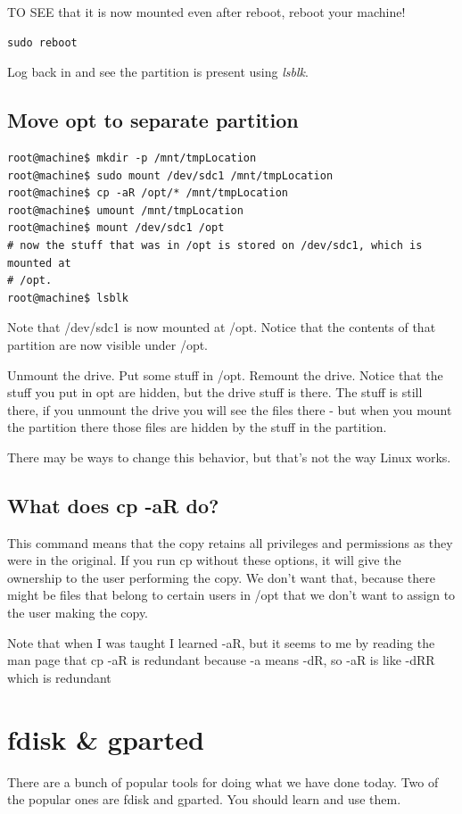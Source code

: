 \documentclass[10pt]{article}
\begin{document}
TO SEE that it is now mounted even after reboot, reboot your machine!

\begin{lstlisting}
sudo reboot
\end{lstlisting}

Log back in and see the partition is present using \textit{lsblk}.

\subsection{Move opt to separate partition}

\begin{lstlisting}
root@machine$ mkdir -p /mnt/tmpLocation
root@machine$ sudo mount /dev/sdc1 /mnt/tmpLocation
root@machine$ cp -aR /opt/* /mnt/tmpLocation
root@machine$ umount /mnt/tmpLocation
root@machine$ mount /dev/sdc1 /opt 
# now the stuff that was in /opt is stored on /dev/sdc1, which is mounted at
# /opt.
root@machine$ lsblk
\end{lstlisting}

Note that /dev/sdc1 is now mounted at /opt. Notice that the contents of that
partition are now visible under /opt.

Unmount the drive. Put some stuff in /opt. Remount the drive. Notice that the
stuff you put in opt are hidden, but the drive stuff is there.  The stuff is
still there, if you unmount the drive you will see the files there - but when
you mount the partition there those files are hidden by the stuff in the
partition.

There may be ways to change this behavior, but that's not the way Linux works. 

\subsection{What does cp -aR do?}
This command means that the copy retains all
privileges and permissions as they were in the original. If you run cp without
these options, it will give the ownership to the user performing the copy. We
don't want that, because there might be files that belong to certain users in
/opt that we don't want to assign to the user making the copy.

Note that when I was taught I learned -aR, but it seems to me by reading the man
page that cp -aR is redundant because -a means -dR, so -aR is like -dRR which is
redundant
\section{fdisk \& gparted}
There are a bunch of popular tools for doing what we
have done today. Two of the popular ones are fdisk and gparted. You should learn
and use them.
\end{document}

